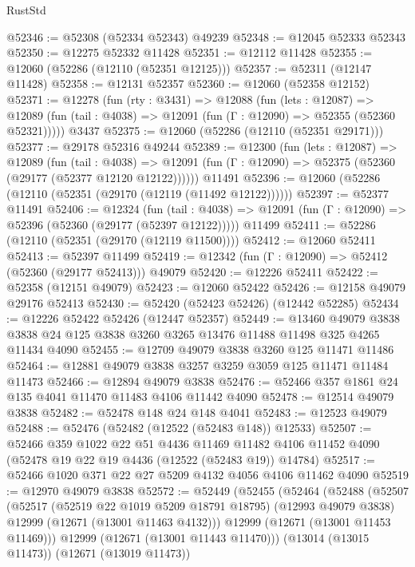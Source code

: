 \begin{lexlean}{RustStd}
\begin{coremodule}
@52346 := @52308 (@52334 @52343) @49239
@52348 := @12045 @52333 @52343
@52350 := @12275 @52332 @11428
@52351 := @12112 @11428
@52355 := @12060 (@52286 (@12110 (@52351 @12125)))
@52357 := @52311 (@12147 @11428)
@52358 := @12131 @52357
@52360 := @12060 (@52358 @12152)
@52371 := @12278
    (fun (rty : @3431) =>
    @12088
      (fun (lets : @12087) =>
      @12089 (fun (tail : @4038) => @12091 (fun (Γ : @12090) => @52355 (@52360 @52321)))))
    @3437
@52375 := @12060 (@52286 (@12110 (@52351 @29171)))
@52377 := @29178 @52316 @49244
@52389 := @12300
    (fun (lets : @12087) =>
    @12089
      (fun (tail : @4038) =>
      @12091 (fun (Γ : @12090) => @52375 (@52360 (@29177 (@52377 @12120 @12122))))))
    @11491
@52396 := @12060 (@52286 (@12110 (@52351 (@29170 (@12119 (@11492 @12122))))))
@52397 := @52377 @11491
@52406 := @12324
    (fun (tail : @4038) => @12091 (fun (Γ : @12090) => @52396 (@52360 (@29177 (@52397 @12122)))))
    @11499
@52411 := @52286 (@12110 (@52351 (@29170 (@12119 @11500))))
@52412 := @12060 @52411
@52413 := @52397 @11499
@52419 := @12342 (fun (Γ : @12090) => @52412 (@52360 (@29177 @52413))) @49079
@52420 := @12226 @52411
@52422 := @52358 (@12151 @49079)
@52423 := @12060 @52422
@52426 := @12158 @49079 @29176 @52413
@52430 := @52420 (@52423 @52426) (@12442 @52285)
@52434 := @12226 @52422 @52426 (@12447 @52357)
@52449 := @13460
    @49079
    @3838
    @3838
    @24
    @125
    @3838
    @3260
    @3265
    @13476
    @11488
    @11498
    @325
    @4265
    @11434
    @4090
@52455 := @12709 @49079 @3838 @3260 @125 @11471 @11486
@52464 := @12881 @49079 @3838 @3257 @3259 @3059 @125 @11471 @11484 @11473
@52466 := @12894 @49079 @3838
@52476 := @52466 @357 @1861 @24 @135 @4041 @11470 @11483 @4106 @11442 @4090
@52478 := @12514 @49079 @3838
@52482 := @52478 @148 @24 @148 @4041
@52483 := @12523 @49079
@52488 := @52476 (@52482 (@12522 (@52483 @148)) @12533)
@52507 := @52466
    @359
    @1022
    @22
    @51
    @4436
    @11469
    @11482
    @4106
    @11452
    @4090
    (@52478 @19 @22 @19 @4436 (@12522 (@52483 @19)) @14784)
@52517 := @52466 @1020 @371 @22 @27 @5209 @4132 @4056 @4106 @11462 @4090
@52519 := @12970 @49079 @3838
@52572 := @52449
    (@52455
      (@52464
        (@52488
          (@52507
            (@52517
              (@52519 @22 @1019 @5209 @18791 @18795)
              (@12993 @49079 @3838)
              @12999
              (@12671 (@13001 @11463 @4132)))
            @12999
            (@12671 (@13001 @11453 @11469)))
          @12999
          (@12671 (@13001 @11443 @11470)))
        (@13014 (@13015 @11473))
        (@12671 (@13019 @11473))

\end{coremodule}
\end{lexlean}
